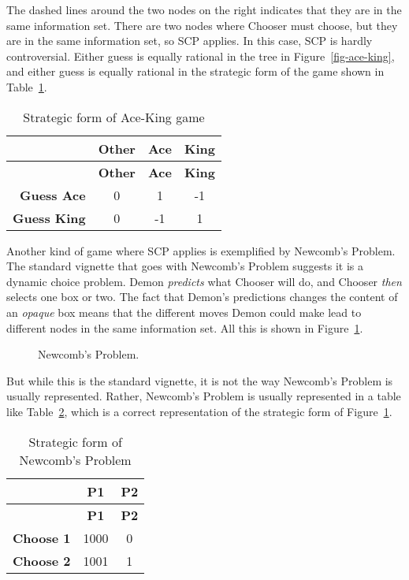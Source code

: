 \documentclass[
  10pt,
  letterpaper,
  DIV=11,
  numbers=noendperiod,
  twoside]{scrartcl}
\begin{document}
The dashed lines around the two nodes on the right indicates that they
are in the same information set. There are two nodes where Chooser must
choose, but they are in the same information set, so SCP applies. In
this case, SCP is hardly controversial. Either guess is equally rational
in the tree in Figure~\ref{fig-ace-king}, and either guess is equally
rational in the strategic form of the game shown in
Table~\ref{tbl-ace-king}.

\begin{longtable}[]{@{}rccc@{}}
\caption{Strategic form of Ace-King
game}\label{tbl-ace-king}\tabularnewline
\toprule\noalign{}
& \textbf{Other} & \textbf{Ace} & \textbf{King} \\
\midrule\noalign{}
\endfirsthead
\toprule\noalign{}
& \textbf{Other} & \textbf{Ace} & \textbf{King} \\
\midrule\noalign{}
\endhead
\bottomrule\noalign{}
\endlastfoot
\textbf{Guess Ace} & 0 & 1 & -1 \\
\textbf{Guess King} & 0 & -1 & 1 \\
\end{longtable}

Another kind of game where SCP applies is exemplified by Newcomb's
Problem. The standard vignette that goes with Newcomb's Problem suggests
it is a dynamic choice problem. Demon \emph{predicts} what Chooser will
do, and Chooser \emph{then} selects one box or two. The fact that
Demon's predictions changes the content of an \emph{opaque} box means
that the different moves Demon could make lead to different nodes in the
same information set. All this is shown in Figure~\ref{fig-newcomb}.

\begin{figure}


\caption{\label{fig-newcomb}Newcomb's Problem.}

\end{figure}%

But while this is the standard vignette, it is not the way Newcomb's
Problem is usually represented. Rather, Newcomb's Problem is usually
represented in a table like Table~\ref{tbl-newcomb}, which is a correct
representation of the strategic form of Figure~\ref{fig-newcomb}.

\begin{longtable}[]{@{}rcc@{}}
\caption{Strategic form of Newcomb's
Problem}\label{tbl-newcomb}\tabularnewline
\toprule\noalign{}
& \textbf{P1} & \textbf{P2} \\
\midrule\noalign{}
\endfirsthead
\toprule\noalign{}
& \textbf{P1} & \textbf{P2} \\
\midrule\noalign{}
\endhead
\bottomrule\noalign{}
\endlastfoot
\textbf{Choose 1} & 1000 & 0 \\
\textbf{Choose 2} & 1001 & 1 \\
\end{longtable}
\end{document}
